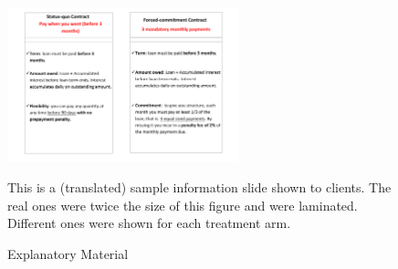 \begin{figure}[H]
     \caption{Explanatory Material}
    \label{ExplanatoryMaterial}
    \begin{center}
        \centering
        \includegraphics[width=0.6\textwidth]{Figuras/micas.pdf}

    \end{center}
    \scriptsize{
        This is a (translated) sample information slide shown to clients. The real ones were twice the size of this figure and were laminated. Different ones were shown for each treatment arm.}
\end{figure}




%
%    
%



